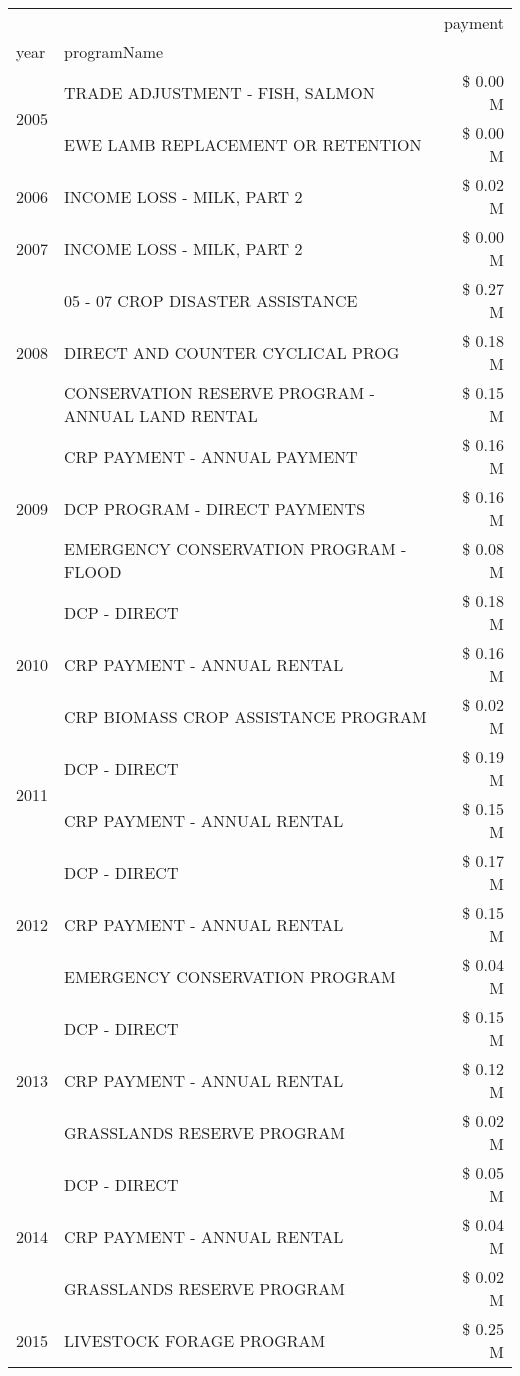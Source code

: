 \begin{tabular}{llr}
\toprule
 &  & payment \\
year & programName &  \\
\midrule
\multirow[t]{2}{*}{2005} & TRADE ADJUSTMENT - FISH, SALMON & \$ 0.00 M \\
 & EWE LAMB REPLACEMENT OR RETENTION & \$ 0.00 M \\
\cline{1-3}
2006 & INCOME LOSS - MILK, PART 2 & \$ 0.02 M \\
\cline{1-3}
2007 & INCOME LOSS - MILK, PART 2 & \$ 0.00 M \\
\cline{1-3}
\multirow[t]{3}{*}{2008} & 05 - 07 CROP DISASTER ASSISTANCE & \$ 0.27 M \\
 & DIRECT AND COUNTER CYCLICAL PROG & \$ 0.18 M \\
 & CONSERVATION RESERVE PROGRAM - ANNUAL LAND RENTAL & \$ 0.15 M \\
\cline{1-3}
\multirow[t]{3}{*}{2009} & CRP PAYMENT - ANNUAL PAYMENT & \$ 0.16 M \\
 & DCP PROGRAM - DIRECT PAYMENTS & \$ 0.16 M \\
 & EMERGENCY CONSERVATION PROGRAM - FLOOD & \$ 0.08 M \\
\cline{1-3}
\multirow[t]{3}{*}{2010} & DCP - DIRECT & \$ 0.18 M \\
 & CRP PAYMENT - ANNUAL RENTAL & \$ 0.16 M \\
 & CRP BIOMASS CROP ASSISTANCE PROGRAM & \$ 0.02 M \\
\cline{1-3}
\multirow[t]{2}{*}{2011} & DCP - DIRECT & \$ 0.19 M \\
 & CRP PAYMENT - ANNUAL RENTAL & \$ 0.15 M \\
\cline{1-3}
\multirow[t]{3}{*}{2012} & DCP - DIRECT & \$ 0.17 M \\
 & CRP PAYMENT - ANNUAL RENTAL & \$ 0.15 M \\
 & EMERGENCY CONSERVATION PROGRAM & \$ 0.04 M \\
\cline{1-3}
\multirow[t]{3}{*}{2013} & DCP - DIRECT & \$ 0.15 M \\
 & CRP PAYMENT - ANNUAL RENTAL & \$ 0.12 M \\
 & GRASSLANDS RESERVE PROGRAM & \$ 0.02 M \\
\cline{1-3}
\multirow[t]{3}{*}{2014} & DCP - DIRECT & \$ 0.05 M \\
 & CRP PAYMENT - ANNUAL RENTAL & \$ 0.04 M \\
 & GRASSLANDS RESERVE PROGRAM & \$ 0.02 M \\
\cline{1-3}
\multirow[t]{3}{*}{2015} & LIVESTOCK FORAGE PROGRAM & \$ 0.25 M \\

\end{tabular}
